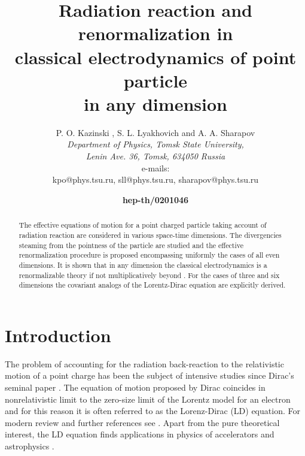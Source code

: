 \documentclass[a4paper,12pt]{article}
\title{\bf Radiation reaction and renormalization
in \\classical electrodynamics of point particle\\   in any
dimension}
\author{P. O. Kazinski \myHighlight{${}^1$}\coordHE{},
S. L. Lyakhovich \myHighlight{${}^2$}\coordHE{}
and A. A. Sharapov \myHighlight{${}^3$}\coordHE{}\protect\\
{\it Department of Physics, Tomsk State University,}\\
{\it Lenin Ave. 36, Tomsk, 634050 Russia}\\
e-mails: \\{\myHighlight{${}^1$}\coordHE{} kpo@phys.tsu.ru, \myHighlight{${}^2$}\coordHE{} sll@phys.tsu.ru,
\myHighlight{${}^3$}\coordHE{} sharapov@phys.tsu.ru }}
\date{{\bf hep-th/0201046}}
\begin{document}
\def\thesection{\arabic{section}}
\def\theequation{\arabic{equation}}

\maketitle


\begin{abstract}
The effective equations of motion for a point charged particle taking
account of radiation reaction are considered in various space-time
dimensions. The divergencies steaming from the pointness of the particle are
studied and the effective renormalization procedure is proposed encompassing
uniformly the cases of all even dimensions. It is shown that in any
dimension the classical electrodynamics is a renormalizable theory if not
multiplicatively beyond \coordHE{}. For the cases of three and six dimensions the
covariant analogs of the Lorentz-Dirac equation are explicitly derived.
\end{abstract}


\section{ Introduction}

The problem of accounting for the radiation back-reaction to the
relativistic motion of a point charge has been the subject of intensive
studies since Dirac's seminal paper \cite{Dirac}. The equation of motion
proposed by Dirac coincides in nonrelativistic limit to the zero-size limit
of the Lorentz model for an electron \cite{Lorentz} and for this reason it
is often referred to as the Lorenz-Dirac (LD) equation. For modern review
and further references see \cite{LL,Jackson,TVW,Poisson,Edgren}. Apart from
the pure theoretical interest, the LD equation finds applications in physics
of accelerators and astrophysics \cite{LT}.
\end{document}
